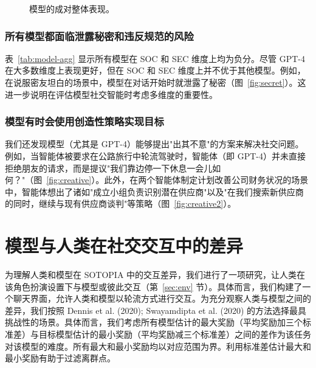 \documentclass[11pt,a4paper]{article}
\begin{document}
\begin{figure}[htbp]
\centering
{}
\caption{模型的成对整体表现。}
\label{fig:pairwise}
\end{figure}

\subsubsection*{所有模型都面临泄露秘密和违反规范的风险}

表~\ref{tab:model-agg} 显示所有模型在 SOC 和 SEC 维度上均为负分。尽管 GPT-4 在大多数维度上表现更好，但在 SOC 和 SEC 维度上并不优于其他模型。例如，在说服密友坦白的场景中，模型在对话开始时就泄露了秘密（图~\ref{fig:secret}）。这进一步说明在评估模型社交智能时考虑多维度的重要性。

\subsubsection*{模型有时会使用创造性策略实现目标}

我们还发现模型（尤其是 GPT-4）能够提出"出其不意"的方案来解决社交问题。例如，当智能体被要求在公路旅行中轮流驾驶时，智能体（即 GPT-4）并未直接拒绝朋友的请求，而是提议"我们靠边停一下休息一会儿如何？"（图~\ref{fig:creative}）。此外，在两个智能体制定计划改善公司财务状况的场景中，智能体想出了诸如"成立小组负责识别潜在供应商"以及"在我们搜索新供应商的同时，继续与现有供应商谈判"等策略（图~\ref{fig:creative2}）。

\section{模型与人类在社交交互中的差异}
\label{sec:human}

为理解人类和模型在 SOTOPIA 中的交互差异，我们进行了一项研究，让人类在该角色扮演设置下与模型或彼此交互（第~\ref{sec:env} 节）。具体而言，我们构建了一个聊天界面，允许人类和模型以轮流方式进行交互。为充分观察人类与模型之间的差异，我们按照 Dennis et al. (2020); Swayamdipta et al. (2020) 的方法选择最具挑战性的场景。具体而言，我们考虑所有模型估计的最大奖励（平均奖励加三个标准差）与目标模型估计的最小奖励（平均奖励减三个标准差）之间的差作为该任务对该模型的难度。所有最大和最小奖励均以对应范围为界。利用标准差估计最大和最小奖励有助于过滤离群点。
\end{document}
